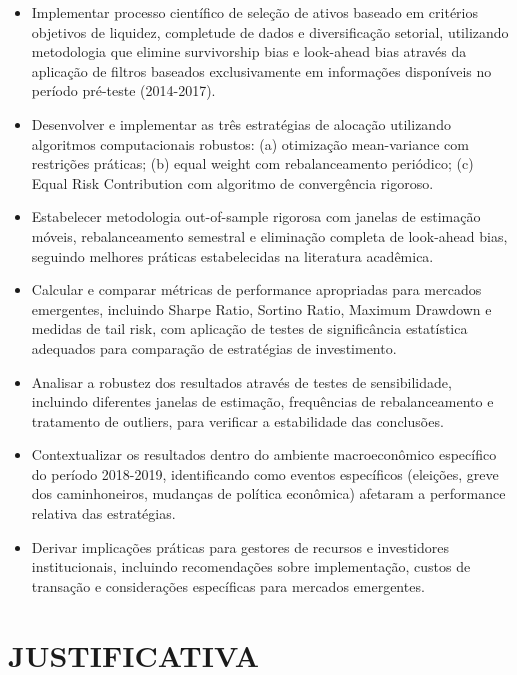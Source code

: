 \begin{itemize}
    \item Implementar processo científico de seleção de ativos baseado em critérios objetivos de liquidez, completude de dados e diversificação setorial, utilizando metodologia que elimine survivorship bias e look-ahead bias através da aplicação de filtros baseados exclusivamente em informações disponíveis no período pré-teste (2014-2017).
    
    \item Desenvolver e implementar as três estratégias de alocação utilizando algoritmos computacionais robustos: (a) otimização mean-variance com restrições práticas; (b) equal weight com rebalanceamento periódico; (c) Equal Risk Contribution com algoritmo de convergência rigoroso.
    
    \item Estabelecer metodologia out-of-sample rigorosa com janelas de estimação móveis, rebalanceamento semestral e eliminação completa de look-ahead bias, seguindo melhores práticas estabelecidas na literatura acadêmica.
    
    \item Calcular e comparar métricas de performance apropriadas para mercados emergentes, incluindo Sharpe Ratio, Sortino Ratio, Maximum Drawdown e medidas de tail risk, com aplicação de testes de significância estatística adequados para comparação de estratégias de investimento.
    
    \item Analisar a robustez dos resultados através de testes de sensibilidade, incluindo diferentes janelas de estimação, frequências de rebalanceamento e tratamento de outliers, para verificar a estabilidade das conclusões.
    
    \item Contextualizar os resultados dentro do ambiente macroeconômico específico do período 2018-2019, identificando como eventos específicos (eleições, greve dos caminhoneiros, mudanças de política econômica) afetaram a performance relativa das estratégias.
    
    \item Derivar implicações práticas para gestores de recursos e investidores institucionais, incluindo recomendações sobre implementação, custos de transação e considerações específicas para mercados emergentes.
\end{itemize}

\section{JUSTIFICATIVA}


